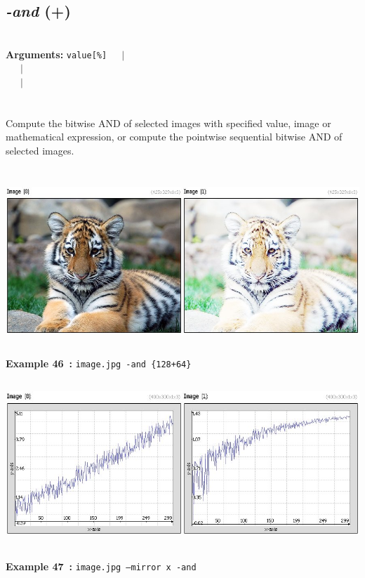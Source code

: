 \documentclass[a4paper,11pt,twoside]{book}
\begin{document}
\subsection{\emph{-and} (+)}\vspace*{-0.5em}
~\\\textbf{Arguments: } 
{\small \texttt{value[\%]}}~~~$|$\\
\hspace*{2.2cm}{\small \texttt{[image]}}~~~$|$\\
~~~$|$\\
\\~\\
Compute the bitwise AND of selected images with specified value, image or mathematical
expression, or compute the pointwise sequential bitwise AND of selected images.
\begin{center}\includegraphics[keepaspectratio=true,height=7cm,width=\textwidth]{img/gmic_def46.jpg}\\
{\footnotesize \textbf{Example 46~:} \texttt{image.jpg -and \{128+64\}}}
\\\includegraphics[keepaspectratio=true,height=7cm,width=\textwidth]{img/gmic_def47.jpg}\\
{\footnotesize \textbf{Example 47~:} \texttt{image.jpg --mirror x -and}}
\end{center}
\end{document}
